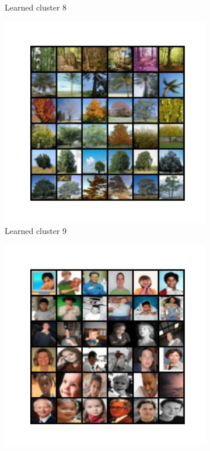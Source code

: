 \documentclass[10pt,twocolumn,letterpaper]{article}
\begin{document}
\begin{figure}
\begin{subfigure}{0.32\textwidth}
       \caption{Learned cluster 8}
     \end{subfigure}
     \hfill
     \begin{subfigure}{0.32\textwidth}
       \includegraphics[width=\linewidth,trim={1cm 2cm 1cm 2cm},clip]{figures/experiments/cifar100_cluster/nearest_class8.png}
       \caption{Learned cluster 9}
     \end{subfigure}
     \hfill
     \begin{subfigure}{0.32\textwidth}
       \includegraphics[width=\linewidth,trim={1cm 2cm 1cm 2cm},clip]{figures/experiments/cifar100_cluster/nearest_class9.png}

\end{subfigure}
\end{figure}
\end{document}
